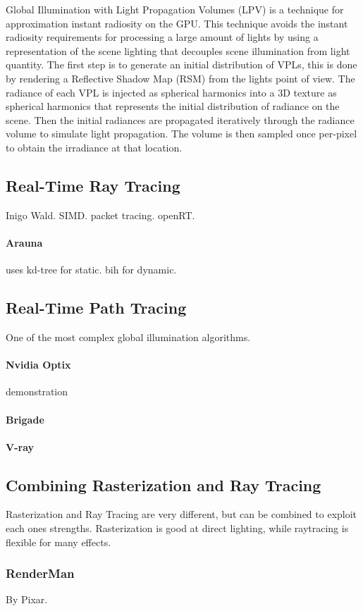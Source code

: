 	Global Illumination with Light Propagation Volumes (LPV) is a technique for approximation instant radiosity on the GPU. \cite{kaplanyan2009} This technique avoids the instant radiosity requirements for processing a large amount of lights by using a representation of the scene lighting that decouples scene illumination from light quantity. The first step is to generate an initial distribution of VPLs, this is done by rendering a Reflective Shadow Map (RSM) \cite{dachsbacher2005} from the lights point of view. The radiance of each VPL is injected as spherical harmonics into a 3D texture as spherical harmonics that represents the initial distribution of radiance on the scene. Then the initial radiances are propagated iteratively through the radiance volume to simulate light propagation. The volume is then sampled once per-pixel to obtain the irradiance at that location.

\subsection {Real-Time Ray Tracing}
	Inigo Wald. SIMD. packet tracing. openRT. 
	\paragraph{Arauna} uses kd-tree for static. bih for dynamic.

\subsection {Real-Time Path Tracing}
	One of the most complex global illumination algorithms. 
	\paragraph {Nvidia Optix} demonstration
	\paragraph {Brigade} 
	\paragraph {V-ray}

\subsection {Combining Rasterization and Ray Tracing}
	Rasterization and Ray Tracing are very different, but can be combined to exploit each ones strengths. Rasterization is good at direct lighting, while raytracing is flexible for many effects.

\subsubsection {RenderMan}
	By Pixar.


